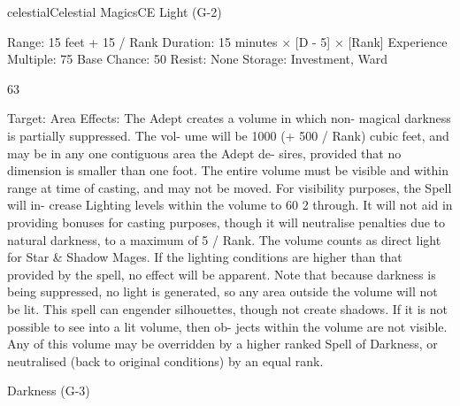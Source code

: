 \begin{College}[1.3]{celestial}{Celestial Magics}{CE}
Light (G-2) 

Range: 15 feet + 15 / Rank 
Duration: 15 minutes × [D - 5] × [Rank] 
Experience Multiple: 75 
Base Chance: 50%
Resist: None 
Storage: Investment, Ward 

63 

Target: Area 
Effects: The Adept creates a volume in which non-
magical  darkness  is  partially  suppressed.  The  vol-
ume  will  be  1000  (+  500  /  Rank)  cubic  feet,  and 
may  be  in  any  one  contiguous  area  the  Adept  de-
sires,  provided  that  no  dimension  is  smaller  than 
one  foot.  The  entire  volume  must  be  visible  and 
within  range  at  time  of  casting,  and  may  not  be 
moved.  For  visibility  purposes,  the  Spell  will  in-
crease Lighting levels within the volume to 60%
2%
through.  It  will  not  aid  in  providing  bonuses  for 
casting purposes, though it will neutralise penalties 
due to natural darkness, to a maximum of 5%
/  Rank.  The  volume  counts  as direct  light  for  Star 
\&  Shadow  Mages.  If  the  lighting  conditions  are 
higher  than  that  provided  by  the  spell,  no  effect 
will  be  apparent.  Note  that  because  darkness  is 
being suppressed, no light is generated, so any area 
outside  the  volume  will  not  be  lit.  This  spell  can 
engender silhouettes, though not create shadows. If 
it is not possible to see into a lit volume, then ob-
jects within the volume are not visible. Any of this 
volume  may  be  overridden  by  a  higher  ranked 
Spell  of  Darkness,  or  neutralised  (back  to  original 
conditions) by an equal rank. 

Darkness (G-3) 


\end{College}
